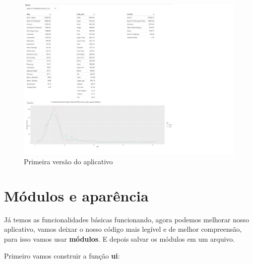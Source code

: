 \documentclass[
]{book}
\begin{document}
\begin{figure}

{\centering \includegraphics[width=1\linewidth]{www/img/versao1} 

}

\caption{Primeira versão do aplicativo}\label{fig:unnamed-chunk-49}
\end{figure}

\hypertarget{muxf3dulos-e-aparuxeancia}{%
\chapter{\texorpdfstring{\textbf{Módulos e aparência}}{Módulos e aparência}}\label{muxf3dulos-e-aparuxeancia}}

Já temos as funcionalidades básicas funcionando, agora podemos melhorar nosso aplicativo, vamos deixar o nosso código mais legível e de melhor compreensão, para isso vamos usar \textbf{módulos}. E depois salvar os módulos em um arquivo.

Primeiro vamos construir a função \textbf{ui}:
\end{document}

